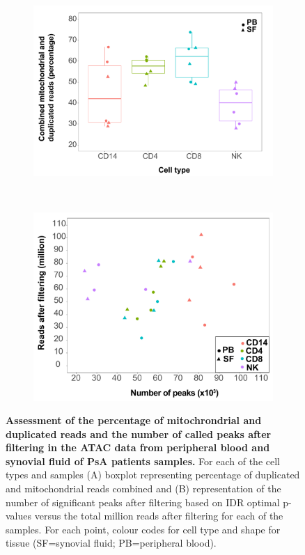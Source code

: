 \bigskip
\begin{figure}[H]
\centering
\begin{subfigure}[b]{0.48\textwidth}
\centering 
\includegraphics[width=\textwidth]{./Appendix/pdfs/Chapter5/ATAC_PSA_pcnt_dups_and_MT_reads_boxplot}
\caption{}
\end{subfigure}%
~
\begin{subfigure}[b]{0.48\textwidth} 
\centering
\includegraphics[width=\textwidth]{./Appendix/pdfs/Chapter5/ATAC_PSA_all_peaks_vs_num_reads}%
\caption{}
\end{subfigure}
\caption[Assessment of the percentage of mitochrondrial and duplicated reads and the number of called peaks after filtering in the ATAC data from peripheral blood and synovial fluid of PsA patients samples.]{\textbf{Assessment of the percentage of  mitochrondrial and duplicated reads and the number of called peaks after filtering in the ATAC data from peripheral blood and synovial fluid of PsA patients samples.} For each of the cell types and samples (A) boxplot representing percentage of duplicated and mitochondrial reads combined and (B) representation of the  number of significant peaks after filtering based on IDR optimal p-values versus the total million reads after filtering for each of the samples. For each point, colour codes for cell type and shape for tissue (SF=synovial fluid; PB=peripheral blood).}

\end{figure}

